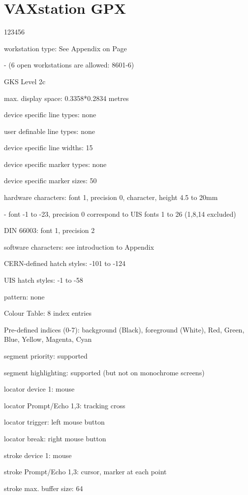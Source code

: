 \section{VAXstation GPX}
\begin{DLtt}{123456}
\item[workstation type:]See Appendix on Page~\pageref{sec:gtstyp}
\item[-](6 open workstations are allowed: 8601-6)
\item[GKS Level]2c
\item[max. display space:]0.3358*0.2834 metres
\item[device specific line types:]none
\item[user definable line types:]none
\item[device specific line widths:]15
\item[device specific marker types:]none
\item[device specific marker sizes:]50
\item[hardware characters:]font 1, precision 0, character, height 4.5 to 20mm
\item[-]font -1 to -23, precision 0 correspond to UIS
fonts 1 to 26 (1,8,14 excluded)
\item[DIN 66003:]font 1, precision 2
\item[software characters:]see introduction to Appendix
\item[CERN-defined hatch styles:]-101 to -124
\item[UIS hatch styles:]-1 to -58
\item[pattern:]none
\item[Colour Table:]8 index entries
\item[Pre-defined indices (0-7):]background (Black), foreground (White), Red,
Green, Blue, Yellow, Magenta, Cyan
\item[segment priority:]supported
\item[segment highlighting:]supported (but not on monochrome screens)
\item[locator device 1:]mouse
\item[locator Prompt/Echo 1,3:]tracking cross
\item[locator trigger:]left mouse button
\item[locator break:]right mouse button
\item[stroke device 1:]mouse
\item[stroke Prompt/Echo 1,3:]cursor, marker at each point
\item[stroke max. buffer size:]64

\end{DLtt}
